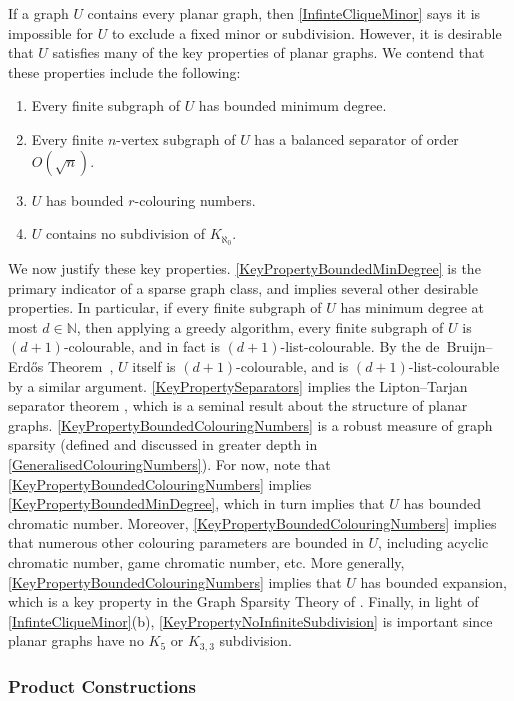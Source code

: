 \documentclass[a4paper,11pt]{article}
\theoremstyle{plain}
\theoremstyle{definition}
\newcommand{\NN}{\mathbb{N}}
\begin{document}
If a graph $U$ contains every planar graph, then \cref{InfinteCliqueMinor} says it is impossible for $U$ to  exclude a fixed minor or subdivision. However, it is desirable that $U$ satisfies many of the key properties of planar graphs. We contend that these properties include the following:
\begin{enumerate}[(K1)]
\item\label{KeyPropertyBoundedMinDegree} Every finite subgraph of $U$ has bounded minimum degree.
\item\label{KeyPropertySeparators}  Every finite $n$-vertex subgraph of $U$ has a balanced separator of order $O(\sqrt{n})$.
\item\label{KeyPropertyBoundedColouringNumbers} $U$ has bounded $r$-colouring numbers.
\item\label{KeyPropertyNoInfiniteSubdivision} $U$ contains no subdivision of $K_{\aleph_0}$.
\end{enumerate}

We now justify these key properties. \cref{KeyPropertyBoundedMinDegree} is the primary indicator of a sparse graph class, and implies several other desirable properties. In particular, if every finite subgraph of $U$ has minimum degree at most $d\in\NN$, then applying a greedy algorithm, every finite subgraph of $U$ is $(d+1)$-colourable, and in fact is $(d+1)$-list-colourable. 
By the de~Bruijn--Erd\H{o}s Theorem~\citep{dBE51}, $U$ itself is $(d+1)$-colourable, and is $(d+1)$-list-colourable by a similar argument. \cref{KeyPropertySeparators} implies the Lipton--Tarjan separator theorem \citep{LT79}, which is a seminal result about the structure of planar graphs. \cref{KeyPropertyBoundedColouringNumbers} is a robust measure of graph sparsity (defined and discussed in greater depth in \cref{GeneralisedColouringNumbers}). For now, note that \cref{KeyPropertyBoundedColouringNumbers} implies \cref{KeyPropertyBoundedMinDegree}, which in turn implies that $U$ has bounded chromatic number. Moreover, \cref{KeyPropertyBoundedColouringNumbers} implies that numerous other colouring parameters are bounded in $U$, including acyclic chromatic number, game chromatic number, etc. More generally, \cref{KeyPropertyBoundedColouringNumbers} implies that $U$ has bounded expansion, which is a key property in the Graph Sparsity Theory of \citet{Sparsity}. Finally, in light of \cref{InfinteCliqueMinor}(b), \cref{KeyPropertyNoInfiniteSubdivision} is important since planar graphs have no $K_5$ or $K_{3,3}$ subdivision. 

\subsubsection*{Product Constructions}
\end{document}
